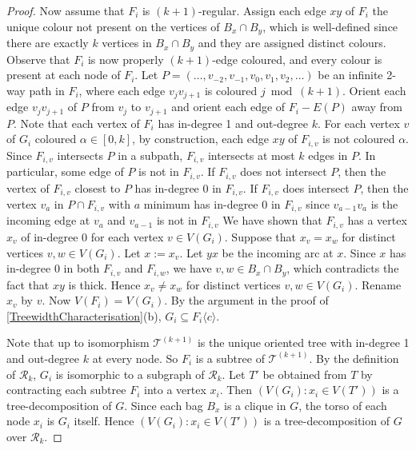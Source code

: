 \documentclass[a4paper,11pt]{article}
\theoremstyle{plain}
\theoremstyle{definition}
\newcommand{\TT}{\mathcal{T}}
\newcommand{\RR}{\mathcal{R}}
\newcommand{\GGG}[2]{#1\langle{#2}\rangle}
\begin{document}
\begin{proof}
Now assume that $F_i$ is $(k+1)$-regular. 
Assign each edge $xy$ of $F_i$ the unique colour not present on the vertices of $B_x\cap B_y$, which is well-defined since there are exactly $k$ vertices in $B_x\cap B_y$ and they are assigned distinct colours. 
Observe that $F_i$ is now properly $(k+1)$-edge coloured, and every colour is present at each node of $F_i$. 
Let $P=(\ldots,v_{-2},v_{-1},v_0,v_1,v_2,\dots)$ be an infinite 2-way path in $F_i$, where each edge $v_jv_{j+1}$ is coloured $j\bmod{(k+1)}$. Orient each edge $v_jv_{j+1}$ of $P$ from $v_j$ to $v_{j+1}$ and orient each edge of $F_i-E(P)$ away from $P$. Note that each vertex of $F_i$ has in-degree 1 and out-degree $k$. 
For each vertex $v$ of $G_i$ coloured $\alpha\in[0,k]$, by construction, each edge $xy$ of $F_{i,v}$ is not coloured $\alpha$. Since $F_{i,v}$ intersects $P$ in a subpath, $F_{i,v}$ intersects at most $k$ edges in $P$. In particular, some edge of $P$ is not in $F_{i,v}$. 
If $F_{i,v}$ does not intersect $P$, then the vertex of $F_{i,v}$ closest to $P$ has in-degree 0 in $F_{i,v}$. 
If $F_{i,v}$ does intersect $P$, then the vertex $v_a$ in $P\cap F_{i,v}$ with $a$ minimum has in-degree 0 in $F_{i,v}$ since $v_{a-1}v_a$ is the incoming edge at $v_a$ and $v_{a-1}$ is not in $F_{i,v}$
We have shown that $F_{i,v}$ has a vertex $x_v$ of in-degree 0 for each vertex $v\in V(G_i)$. 
Suppose that $x_v=x_w$ for distinct vertices $v,w\in V(G_i)$. Let $x:=x_v$. 
Let $yx$ be the incoming arc at $x$. 
Since $x$ has in-degree 0 in both $F_{i,v}$ and $F_{i,w}$, we have $v,w\in B_x\cap B_y$, which contradicts the fact that $xy$ is thick. 
Hence $x_v\neq x_w$ for distinct vertices $v,w\in V(G_i)$. 
Rename $x_v$ by $v$. Now $V(F_i)=V(G_i)$. 
By the argument in the proof of \cref{TreewidthCharacterisation}(b), $G_i \subseteq \GGG{F_i}{c}$.

Note that up to isomorphism $\TT^{(k+1)}$ is the unique oriented tree with in-degree 1 and out-degree $k$ at every node.  So $F_i$ is a subtree of $\TT^{(k+1)}$. By the definition of $\RR_k$, $G_i$ is isomorphic to a subgraph of $\RR_k$. Let $T'$ be obtained from $T$ by contracting each subtree $F_i$ into a vertex $x_i$. Then $(V(G_i): x_i \in V(T'))$ is a tree-decomposition of $G$. Since each bag $B_x$ is a clique in $G$, the torso of each node $x_i$ is $G_i$ itself. Hence  $(V(G_i): x_i \in V(T'))$ is a tree-decomposition of $G$ over $\RR_k$. 


\end{proof}
\end{document}
